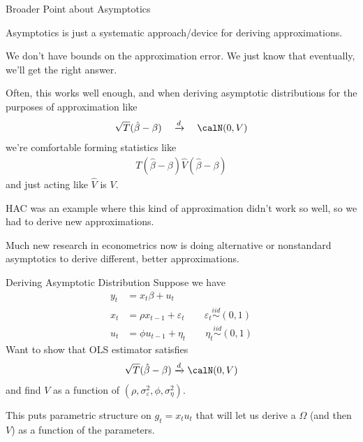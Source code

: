 \documentclass[handout]{beamer}
\newcommand{\iid}{\overset{iid}{\sim}}
\newcommand{\dto}{\xrightarrow{d}}
\begin{document}
\begin{frame}[shrink]{Broader Point about Asymptotics}

\alert{Asymptotics} is just a systematic approach/device for deriving
approximations.

We don't have bounds on the approximation error.
We just know that \alert{eventually}, we'll get the right answer.

Often, this works well enough, and when deriving asymptotic
distributions for the purposes of approximation like 
\begin{align*}
  \sqrt{T}(\hat{\beta}-\beta)
  \quad\dto\quad
  \calN(0,V)
\end{align*}
we're comfortable forming statistics like
\begin{align*}
  T(\hat{\beta}-\beta)\hat{V}(\hat{\beta}-\beta)
\end{align*}
and just acting like $\hat{V}$ is $V$.

HAC was an example where this kind of approximation didn't work so well,
so we had to derive new approximations.

Much new research in econometrics now is doing \alert{alternative} or
\alert{nonstandard asymptotics} to derive different, better
approximations.
\end{frame}


\begin{frame}[shrink]{Deriving Asymptotic Distribution}
Suppose we have
\begin{align*}
  y_t &= x_t \beta + u_t
  \\
  x_t &= \rho x_{t-1} + \varepsilon_t
  \qquad
  \varepsilon_t\iid (0,1)
  \\
  u_t &= \phi u_{t-1} + \eta_t
  \qquad
  \eta_t\iid(0,1)
\end{align*}
Want to show that OLS estimator satisfies
\begin{align*}
  \sqrt{T}(\hat{\beta}-\beta)
  \dto
  \calN(0,V)
\end{align*}
and find $V$ as a function of
$(\rho,\sigma^2_\varepsilon,\phi,\sigma^2_\eta)$.

This puts parametric structure on $g_t=x_tu_t$ that will let us derive a
$\Omega$ (and then $V$) as a function of the parameters.
\end{frame}
\end{document}
